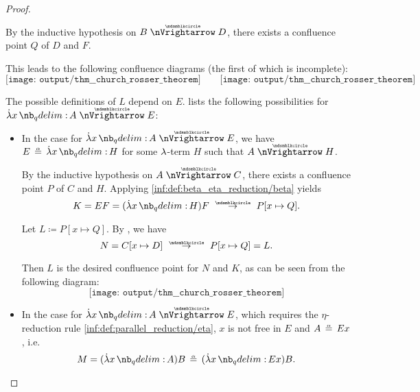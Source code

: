 \begin{proof}
\begin{itemize}
\begin{itemize}
      By the inductive hypothesis on \( B \ppred D \), there exists a confluence point \( Q \) of \( D \) and \( F \).

      This leads to the following confluence diagrams (the first of which is incomplete):
      \begin{equation*}
        \texttt{[image: output/thm\_\_church\_rosser\_theorem]}
        \quad\quad
        \texttt{[image: output/thm\_\_church\_rosser\_theorem]}
      \end{equation*}

      The possible definitions of \( L \) depend on \( E \).  lists the following possibilities for \( \qabs x A \ppred E \):
      \begin{itemize}
        \item In the case  for \( \qabs x A \ppred E \), we have \( E \aequiv \qabs x H \) for some \( {\mathrm \lambda} \)-term \( H \) such that \( A \ppred H \).

        By the inductive hypothesis on \( A \ppred C \), there exists a confluence point \( P \) of \( C \) and \( H \). Applying \ref{inf:def:beta_eta_reduction/beta} yields
        \begin{equation*}
          K = EF = (\qabs x H)F \pred P[x \mapsto Q].
        \end{equation*}

        Let \( L \coloneqq P[x \mapsto Q] \). By , we have
        \begin{equation*}
          N = C[x \mapsto D] \pred P[x \mapsto Q] = L.
        \end{equation*}

        Then \( L \) is the desired confluence point for \( N \) and \( K \), as can be seen from the following diagram:
        \begin{equation*}
          \texttt{[image: output/thm\_\_church\_rosser\_theorem]}
        \end{equation*}

        \item In the case  for \( \qabs x A \ppred E \), which requires the \( \eta \)-reduction rule \ref{inf:def:parallel_reduction/eta}, \( x \) is not free in \( E \) and \( A \aequiv Ex \), i.e.
        \begin{equation*}
          M = (\qabs x A) B \aequiv (\qabs x E x) B.
        \end{equation*}


\end{itemize}
\end{itemize}
\end{itemize}
\end{proof}
